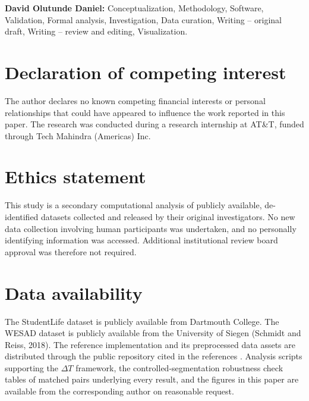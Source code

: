 \documentclass[preprint,12pt,authoryear]{elsarticle}
\newcommand{\dt}{$\Delta T$}
\providecommand{\DIFaddtex}[1]{{\protect\color{blue} \sf #1}} %
\providecommand{\DIFdeltex}[1]{{\protect\color{red} \scriptsize #1}} %
\providecommand{\DIFaddbegin}{} %
\providecommand{\DIFaddend}{} %
\providecommand{\DIFdelbegin}{} %
\providecommand{\DIFdelend}{} %
\providecommand{\DIFadd}[1]{\texorpdfstring{\DIFaddtex{#1}}{#1}} %
\providecommand{\DIFdel}[1]{\texorpdfstring{\DIFdeltex{#1}}{}} %
\newcommand{\DIFscaledelfig}{0.5}
\newlength{\DIFdelgraphicswidth} %
\newlength{\DIFdelgraphicsheight} %
\newcommand{\DIFaddincludegraphics}[2][]{{\color{blue}\fbox{\DIFOincludegraphics[#1]{#2}}}} %
\newcommand{\DIFdelincludegraphics}[2][]{%
\sbox{\DIFdelgraphicsbox}{\DIFOincludegraphics[#1]{#2}}%
\settoboxwidth{\DIFdelgraphicswidth}{\DIFdelgraphicsbox} %
\settoboxtotalheight{\DIFdelgraphicsheight}{\DIFdelgraphicsbox} %
\scalebox{\DIFscaledelfig}{%
\parbox[b]{\DIFdelgraphicswidth}{\usebox{\DIFdelgraphicsbox}\\[-\baselineskip] \rule{\DIFdelgraphicswidth}{0em}}\llap{\resizebox{\DIFdelgraphicswidth}{\DIFdelgraphicsheight}{%
\setlength{\unitlength}{\DIFdelgraphicswidth}%
\begin{picture}(1,1)%
\thicklines\linethickness{2pt} %
{\color[rgb]{1,0,0}\put(0,0){\framebox(1,1){}}}%
{\color[rgb]{1,0,0}\put(0,0){\line( 1,1){1}}}%
{\color[rgb]{1,0,0}\put(0,1){\line(1,-1){1}}}%
\end{picture}%
}\hspace*{3pt}}} %
} %
\DeclareRobustCommand{\DIFaddbegin}{\DIFOaddbegin \let\includegraphics\DIFaddincludegraphics} %
\DeclareRobustCommand{\DIFaddend}{\DIFOaddend \let\includegraphics\DIFOincludegraphics} %
\DeclareRobustCommand{\DIFdelbegin}{\DIFOdelbegin \let\includegraphics\DIFdelincludegraphics} %
\DeclareRobustCommand{\DIFdelend}{\DIFOaddend \let\includegraphics\DIFOincludegraphics} %
\begin{document}
\textbf{David Olutunde Daniel:} Conceptualization, Methodology,
Software, Validation, Formal analysis, Investigation, Data curation,
Writing -- original draft, Writing -- review and editing, Visualization.

\section*{Declaration of competing interest}

The author declares no known competing financial interests or personal
relationships that could have appeared to influence the work reported in
this paper. The research was conducted during a research internship at
AT\&T, funded through Tech Mahindra (Americas) Inc.

\section*{Ethics statement}

This study is a secondary computational analysis of publicly available,
de-identified datasets collected and released by their original
investigators. No new data collection involving human participants was
undertaken, and no personally identifying information was accessed.
Additional institutional review board approval was therefore not
required.

\section*{Data availability}

The StudentLife dataset is publicly available from Dartmouth College.
The \DIFdelbegin \DIFdel{WESAD dataset is publicly available from the University of Siegen
(Schmidt and Reiss, 2018). The }\DIFdelend reference implementation and its preprocessed
data assets are distributed through the public repository cited in the
references \citep{iflrepo}. Analysis scripts supporting the \dt{}
framework, the \DIFdelbegin \DIFdel{controlled-segmentation robustness check}\DIFdelend \DIFaddbegin \DIFadd{tables of matched pairs underlying every result}\DIFaddend , and
the figures in this paper are available from the corresponding author
on reasonable request.
\end{document}
